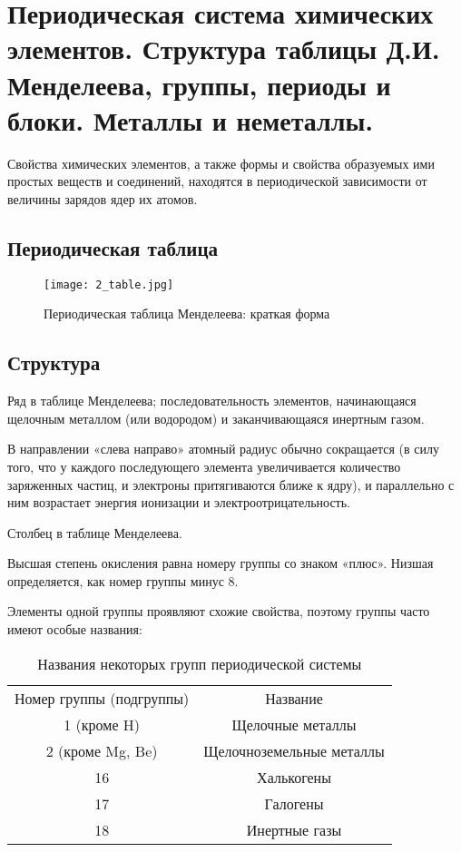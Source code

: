 \section{Периодическая система химических элементов. Структура таблицы Д.И. Менделеева, группы, периоды и блоки. Металлы и неметаллы.}


Свойства химических элементов, а также формы и свойства образуемых ими простых веществ и соединений, находятся в периодической зависимости от величины зарядов ядер их атомов.

\subsection{Периодическая таблица}

\begin{figure}[H]
    \centering
    \texttt{[image: 2\_table.jpg]}
    \caption{Периодическая таблица Менделеева: краткая форма}
    \label{fig:2table}
\end{figure}

\subsection{Структура}

Ряд в таблице Менделеева; последовательность элементов, начинающаяся щелочным металлом (или водородом) и заканчивающаяся инертным газом. 

В направлении «слева направо» атомный радиус обычно сокращается (в силу того, что у каждого последующего элемента увеличивается количество заряженных частиц, и электроны притягиваются ближе к ядру), и параллельно с ним возрастает энергия ионизации и электроотрицательность.


Столбец в таблице Менделеева. 

Высшая степень окисления равна номеру группы со знаком «плюс». Низшая определяется, как номер группы минус 8.

Элементы одной группы проявляют схожие свойства, поэтому группы часто имеют особые названия:

\begin{table}[H]
    \centering
    \begin{tabular}{c|c}
    \hline
        Номер группы (подгруппы) &  Название\\
         1 (кроме H) &  Щелочные металлы \\
         2 (кроме Mg, Be) &  Щелочноземельные металлы \\
         16 &  Халькогены \\
         17 &  Галогены \\
         18 &  Инертные газы \\
    \hline
    \end{tabular}
    \caption{Названия некоторых групп периодической системы}
    \label{tab:2groups}
\end{table}

